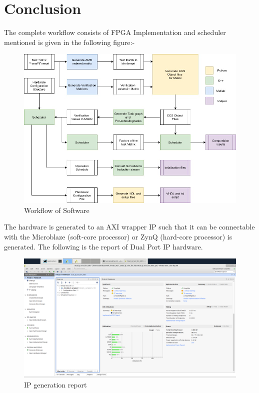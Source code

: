 \chapter{Conclusion}
The complete workflow consists of FPGA Implementation and scheduler mentioned is given in the following figure:-


\begin{figure}[H]
    \centering
    \includegraphics[width = \textwidth]{./Software/Workflow.jpg}
    \caption{Workflow of Software}
\end{figure}


The hardware is generated to an AXI wrapper IP such that it can be connectable with the Microblaze (soft-core processor)  or  ZynQ (hard-core processor) is generated. The following is the report of Dual Port IP hardware.\\



\begin{figure}[H]
    \centering
    \includegraphics[width = \textwidth]{./Software/Report.png}
    \caption{IP generation report}
\end{figure}



